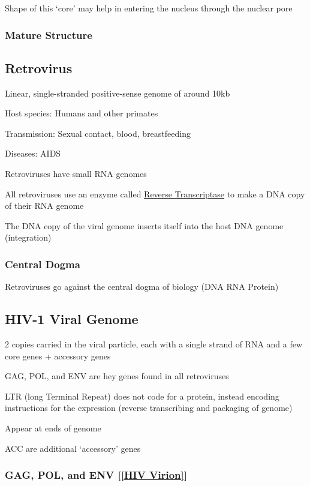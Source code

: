 \documentclass{notes}
\begin{document}
\tab Shape of this `core' may help in entering the nucleus through the nuclear pore

\subsubsection{Mature Structure}


\subsection{Retrovirus}

Linear, single-stranded positive-sense genome of around 10kb

Host species: Humans and other primates

Transmission: Sexual contact, blood, breastfeeding

Diseases: AIDS

Retroviruses have small RNA genomes

All retroviruses use an enzyme called \ul{Reverse Transcriptase} to make a DNA copy of their RNA genome

\tab The DNA copy of the viral genome inserts itself into the host DNA genome (integration)

\subsubsection{Central Dogma}

Retroviruses go against the central dogma of biology (DNA \indicates RNA \indicates Protein)

\subsection{HIV-1 Viral Genome}

2 copies carried in the viral particle, each with a single strand of RNA and a few core genes + accessory genes

GAG, POL, and ENV are hey genes found in all retroviruses

LTR (long Terminal Repeat) does not code for a protein, instead encoding instructions for the expression (reverse transcribing and packaging of genome)

\indicates Appear at ends of genome

ACC are additional `accessory' genes

\subsubsection{GAG, POL, and ENV [\ref{HIV Virion}]}
\end{document}

